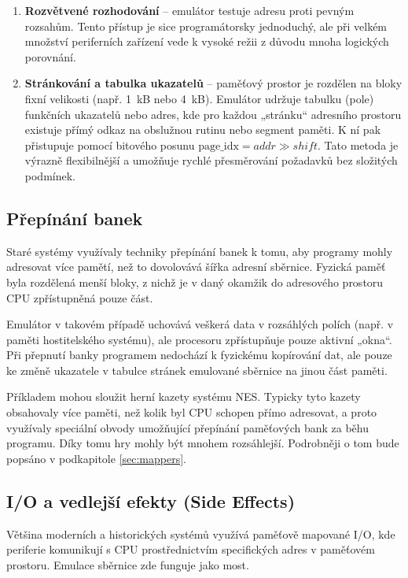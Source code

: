\begin{enumerate}
    \item \textbf{Rozvětvené rozhodování} -- emulátor testuje adresu proti pevným rozsahům. Tento
            přístup je sice programátorsky jednoduchý, ale při velkém množství periferních zařízení
            vede k vysoké režii z důvodu mnoha logických porovnání.
    \item \textbf{Stránkování a tabulka ukazatelů} -- paměťový prostor je rozdělen na bloky fixní
        velikosti (např. 1~kB nebo 4~kB). Emulátor udržuje tabulku (pole) funkčních ukazatelů nebo
        adres, kde pro každou „stránku“ adresního prostoru existuje přímý odkaz na obslužnou rutinu
        nebo segment paměti. K ní pak přistupuje pomocí bitového posunu $\text{page\_idx} = addr \gg
        shift$.  Tato metoda je výrazně flexibilnější a umožňuje rychlé přesměrování požadavků bez
        složitých podmínek.
\end{enumerate}

\subsection{Přepínání banek}

Staré systémy využívaly techniky přepínání banek k tomu, aby programy mohly adresovat více pamětí,
než to dovolovává šířka adresní sběrnice. Fyzická paměť byla rozdělená menší bloky, z nichž je v
daný okamžik do adresového prostoru CPU zpřístupněná pouze část.

Emulátor v takovém případě uchovává veškerá data v rozsáhlých polích (např. v paměti hostitelského
systému), ale procesoru zpřístupňuje pouze aktivní „okna“. Při přepnutí banky programem nedochází k
fyzickému kopírování dat, ale pouze ke změně ukazatele v tabulce stránek emulované sběrnice na jinou
část paměti.

Příkladem mohou sloužit herní kazety systému NES. Typicky tyto kazety obsahovaly více paměti, než
kolik byl CPU schopen přímo adresovat, a proto využívaly speciální obvody umožňující přepínání
paměťových bank za běhu programu. Díky tomu hry mohly být mnohem rozsáhlejší. Podrobněji o tom bude
popsáno v podkapitole \ref{sec:mappers}.

\subsection{I/O a vedlejší efekty (Side Effects)}

Většina moderních a historických systémů využívá paměťově mapované I/O, kde periferie komunikují s
CPU prostřednictvím specifických adres v paměťovém prostoru. Emulace sběrnice zde funguje jako most.

